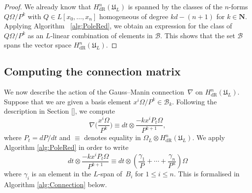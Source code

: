 \documentclass[a4paper,11pt]{article}
\numberwithin{equation}{section}
\newcommand{\NN}{\mathbf{N}} %
\providecommand{\HdR}{H_{\text{dR}}}    %
\providecommand{\cB}{\mathcal{B}} %
\theoremstyle{definition}
\begin{document}
\begin{proof}
We already know that $\HdR^n(\mathfrak{U}_L)$ is spanned by the classes of the 
$n$-forms $Q \Omega / P^k$ with $Q \in L[x_0, \dotsc, x_n]$ homogeneous of degree 
$kd - (n+1)$ for $k \in \NN$. Applying Algorithm ~\ref{alg:PoleRed}, we obtain an 
expression for the class of $Q \Omega / P^k$ as an $L$-linear combination of 
elements in $\cB$.  This shows that the set $\cB$ spans the vector space 
$\HdR^n(\mathfrak{U}_L)$.


\end{proof}


\subsection{Computing the connection matrix}
\label{sec:Connection}

We now describe the action of the Gauss--Manin connection~$\nabla$ on 
$\HdR^n(\mathfrak{U}_L)$.  Suppose that we are given a basis element 
$x^i \Omega / P^k \in \cB_k$.  Following the description in Section [], we compute
\begin{equation} \label{eqn:nabla}
\nabla \biggl(\frac{x^i \Omega}{P^k}\biggr) \equiv dt \otimes \frac{- k x^i P_t \Omega}{P^{k+1}},
\end{equation}
where $P_t = dP/dt$ and $\equiv$ denotes equality in $\Omega_{L} \otimes \HdR^n(\mathfrak{U}_L)$. 
We apply Algorithm \ref{alg:PoleRed} in order to write
\begin{equation*}
dt \otimes \frac{- k x^i P_t \Omega}{P^{k+1}} \equiv 
dt \otimes \left( \frac{\gamma_{1}}{P} + \dotsb + \frac{\gamma_n}{P^n} \right) \Omega
\end{equation*}
where $\gamma_i$ is an element in the $L$-span of~$B_i$ for $1 \leq i \leq n$. This is
formalised in Algorithm \ref{alg:Connection} below.
\end{document}
